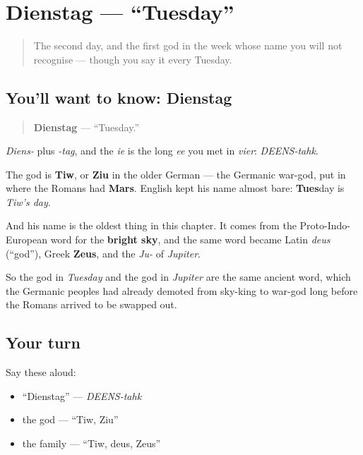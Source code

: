 \section[Dienstag]{Dienstag — \textquotedblleft{}Tuesday\textquotedblright{}}

\label{lesson:GE-C07-dienstag}



\begin{quote}
The second day, and the first god in the week whose name you will not recognise — though you say it every Tuesday.
\end{quote}

\subsection*{You'll want to know: Dienstag}
\begin{quote}
\textbf{Dienstag} — \textquotedblleft{}Tuesday.\textquotedblright{}
\end{quote}

\emph{Diens-} plus \emph{-tag}, and the \emph{ie} is the long \emph{ee} you met in \emph{vier}: \emph{DEENS-tahk}.

\begin{cousinweb}
The god is \textbf{Tiw}, or \textbf{Ziu} in the older German — the Germanic war-god, put in where the Romans had \textbf{Mars}. English kept his name almost bare: \textbf{Tues}day is \emph{Tiw's day}.

And his name is the oldest thing in this chapter. It comes from the Proto-Indo-European word for the \textbf{bright sky}, and the same word became Latin \emph{deus} (\textquotedblleft{}god\textquotedblright{}), Greek \textbf{Zeus}, and the \emph{Ju-} of \emph{Jupiter}.

So the god in \emph{Tuesday} and the god in \emph{Jupiter} are the same ancient word, which the Germanic peoples had already demoted from sky-king to war-god long before the Romans arrived to be swapped out.
\end{cousinweb}

\subsection*{Your turn}
Say these aloud:

\begin{itemize}
\raggedright
  \item \textquotedblleft{}Dienstag\textquotedblright{} — \emph{DEENS-tahk}
  \item the god — \textquotedblleft{}Tiw, Ziu\textquotedblright{}
  \item the family — \textquotedblleft{}Tiw, deus, Zeus\textquotedblright{}
\end{itemize}

